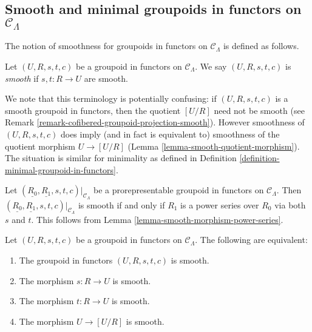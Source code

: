 \subsection{Smooth and minimal groupoids in functors on $\mathcal{C}_\Lambda$}
\label{subsection-smooth-minimal-groupoids-in-functors}

\noindent
The notion of smoothness for groupoids in functors on $\mathcal{C}_\Lambda$ is 
defined as follows.

\begin{definition}
\label{definition-smooth-groupoid-in-functors}
Let $(U, R, s,t,c)$ be a groupoid in functors on $\mathcal{C}_\Lambda$.  We 
say $(U, R, s,t,c)$ is {\it smooth} if $s,t: R \to U$ are smooth.
\end{definition}

\begin{remark}
\label{remark-smooth-groupoid-in-functors-warning}
We note that this terminology is potentially confusing: if $(U, R, s,t,c)$ is a 
smooth groupoid in functors, then the quotient $[U/R]$ need not be smooth (see 
Remark \ref{remark-cofibered-groupoid-projection-smooth}).  However smoothness 
of $(U, R, s,t,c)$ does imply (and in fact is equivalent to) smoothness of the 
quotient morphism $U \to [U/R]$ (Lemma 
\ref{lemma-smooth-quotient-morphism}).  The situation is similar for minimality 
as defined in Definition \ref{definition-minimal-groupoid-in-functors}.
\end{remark}

\begin{remark}
\label{remark-smooth-power-series-prorepresentable-smooth-groupoid-in-functors}
Let $(\underline{R_0}, \underline{R_1}, s,t,c)|_{\mathcal{C}_\Lambda}$ be a 
prorepresentable groupoid in functors on $\mathcal{C}_\Lambda$.  Then 
$(\underline{R_0}, \underline{R_1}, s,t,c)|_{\mathcal{C}_\Lambda}$ is smooth 
if and only if $R_1$ is a power series over $R_0$ via both $s$ and $t$.  This 
follows from
Lemma \ref{lemma-smooth-morphism-power-series}.
\end{remark}

\begin{lemma}
\label{lemma-smooth-quotient-morphism}
Let $(U, R, s,t,c)$ be a groupoid in functors on $\mathcal{C}_\Lambda$.  The 
following are equivalent: 
\begin{enumerate}
\item The groupoid in functors $(U, R, s,t,c)$ is smooth.
\item The morphism $s: R \to U$ is smooth.
\item The morphism $t: R \to U$ is smooth.
\item The morphism $U \to [U/R]$ is smooth.
\end{enumerate}
\end{lemma}


